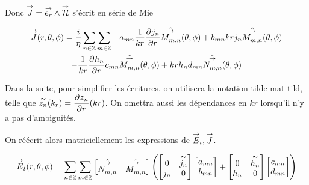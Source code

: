         Donc \(\vJ = \vect{e_r} \pvect \vH\) s'écrit en série de Mie

        \begin{multline}
            \vJ(\rtp) = \frac{i}{\eta}\sum_{n\in\ZZ}\sum_{m\in\ZZ} - a_{mn} \frac{1}{kr}\ddr{r}{j_n}\hat{\Mmn}(\tp) + b_{mn} k r j_n \hat{\Mmn}(\tp)
            \\
            -  \frac{1}{kr}\ddr{r}{h_n} c_{mn} \hat{\Mmn}(\tp) + k r h_n d_{mn} \hat{\Nmn}(\tp)
        \end{multline}

        Dans la suite, pour simplifier les écritures, on utilisera la notation tilde \gls{mat-tild}, telle que \( \tilde{z_n}(k_r) = \ddr{r}{z_n}(kr) \). On omettra aussi les dépendances en \(kr\) lorsqu'il n'y a pas d’ambiguïtés.

        On réécrit alors matriciellement les expressions de \(\vE_t,\vJ\).

        \begin{equation}
            \vE_t(\rtp) = \sum_{n\in\ZZ}\sum_{m\in\ZZ}
            \begin{bmatrix}
              \hat{\Nmn} & \hat{\Mmn}
            \end{bmatrix}
            \left( 
              \begin{bmatrix}
                  0 & \tilde{j_n}
                  \\
                  j_n & 0
              \end{bmatrix}
              \begin{bmatrix}
                  a_{mn}
                  \\
                  b_{mn}
              \end{bmatrix}
              + 
              \begin{bmatrix}
                  0 & \tilde{h_n}
                  \\
                  h_n & 0
              \end{bmatrix}
              \begin{bmatrix}
                  c_{mn}
                  \\
                  d_{mn}
              \end{bmatrix}
            \right)
        \end{equation}


